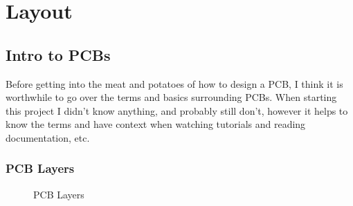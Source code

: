 \chapter{Layout
\label{Layout}}
\section{Intro to PCBs}
Before getting into the meat and potatoes of how to design a PCB, I think it is worthwhile to go over the terms and basics surrounding PCBs.
When starting this project I didn't know anything, and probably still don't, however it helps to know the terms and have context when
watching tutorials and reading documentation, etc.

\subsection{PCB Layers}

\begin{figure}[H]
  \centering
\caption{PCB Layers}
\label{img:pcblayers}
\end{figure}

